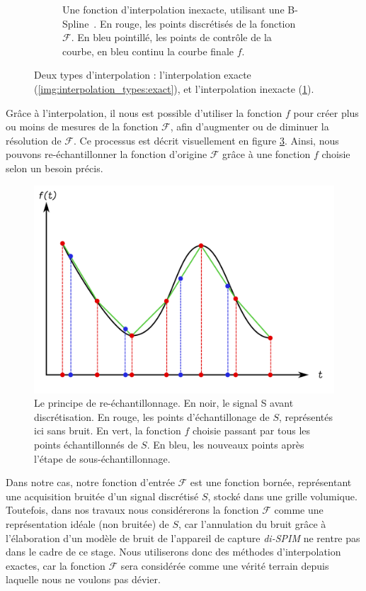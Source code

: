 {{{\begin{figure}[!h]
\begin{subfigure}{.49\linewidth}
		            \captionsetup{width=.8\linewidth}
		            \caption{Une fonction d'interpolation inexacte, utilisant une B-Spline~\cite{cite_bspline_original}. En rouge, les points discrétisés de la fonction $\mathcal{F}$. En bleu pointillé, les points de contrôle de la courbe, en bleu continu la courbe finale $f$.}
		            \label{img:interpolation_types:inexact}
		        \end{subfigure}
		        \captionsetup{width=.9\linewidth}
		        \caption{Deux types d'interpolation : l'interpolation exacte (\ref{img:interpolation_types:exact}), et l'interpolation inexacte (\ref{img:interpolation_types:inexact}).}
		        \label{img:interpolation_types}
		    \end{figure}
		    
		    Grâce à l'interpolation, il nous est possible d'utiliser la fonction $f$ pour créer plus ou moins de mesures de la fonction $\mathcal{F}$, afin d'augmenter ou de diminuer la résolution de $\mathcal{F}$. Ce processus est décrit visuellement en figure \ref{img:resampling_principle}. Ainsi, nous pouvons re-échantillonner la fonction d'origine $\mathcal{F}$ grâce à une fonction $f$ choisie selon un besoin précis.

			\begin{figure}[!h]
			    \centering
			    \includegraphics[width=.67\linewidth]{img/interpolation_principle.png}
			    \captionsetup{width=.8\linewidth}
			    \caption{Le principe de re-échantillonnage. En noir, le signal S avant discrétisation. En rouge, les points d'échantillonage de $S$, représentés ici sans bruit. En vert, la fonction $f$ choisie passant par tous les points échantillonnés de $S$. En bleu, les nouveaux points après l'étape de sous-échantillonnage.}
			    \label{img:resampling_principle}
			\end{figure}

		    Dans notre cas, notre fonction d'entrée $\mathcal{F}$ est une fonction bornée, représentant une acquisition bruitée d'un signal discrétisé $S$, stocké dans une grille volumique. Toutefois, dans nos travaux nous considérerons la fonction $\mathcal{F}$ comme une représentation idéale (non bruitée) de $S$, car l'annulation du bruit grâce à l'élaboration d'un modèle de bruit de l'appareil de capture \textit{di-SPIM} ne rentre pas dans le cadre de ce stage. Nous utiliserons donc des méthodes d'interpolation exactes, car la fonction $\mathcal{F}$ sera considérée comme une vérité terrain depuis laquelle nous ne voulons pas dévier.

}}}
